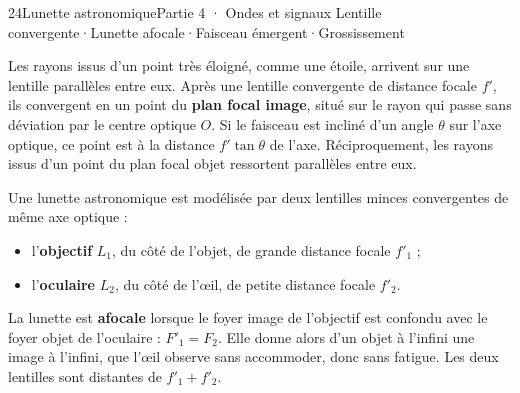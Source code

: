 \begin{ouverture}[lunette]{24}{Lunette astronomique}{Partie 4 · Ondes et signaux}
{Lentille convergente\enspace·\enspace Lunette afocale\enspace·\enspace Faisceau émergent\enspace·\enspace Grossissement}
\end{ouverture}
\essentiel
{}
\begin{propriete}
Les rayons issus d'un point très éloigné, comme une étoile, arrivent sur une lentille parallèles entre eux. Après une
lentille convergente de distance focale $f'$, ils convergent en un point du \textbf{plan focal image}, situé sur le rayon
qui passe sans déviation par le centre optique $O$. Si le faisceau est incliné d'un angle $\theta$ sur l'axe optique, ce
point est à la distance $f'\tan\theta$ de l'axe. Réciproquement, les rayons issus d'un point du plan focal objet ressortent
parallèles entre eux.
\end{propriete}
\begin{definition}
Une lunette astronomique est modélisée par deux lentilles minces convergentes de même axe optique :
\begin{itemize}
\item l'\textbf{objectif} $L_1$, du côté de l'objet, de grande distance focale $f'_1$ ;
\item l'\textbf{oculaire} $L_2$, du côté de l'œil, de petite distance focale $f'_2$.
\end{itemize}
La lunette est \textbf{afocale} lorsque le foyer image de l'objectif est confondu avec le foyer objet de l'oculaire :
$F'_1=F_2$. Elle donne alors d'un objet à l'infini une image à l'infini, que l'œil observe sans accommoder, donc sans
fatigue. Les deux lentilles sont distantes de $f'_1+f'_2$.
\end{definition}
